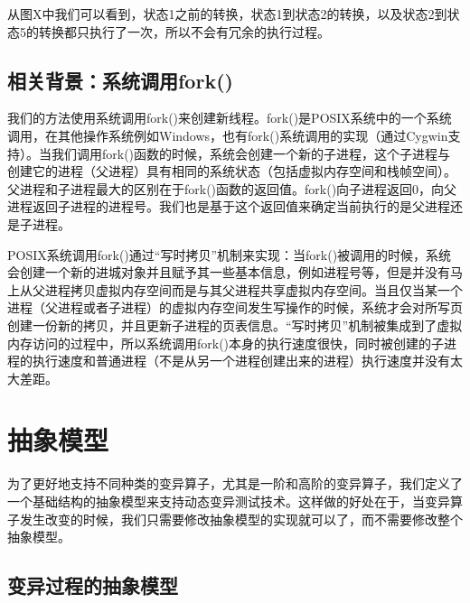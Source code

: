 \documentclass[nofonts]{ctexrep}
\begin{document}
从图X中我们可以看到，状态1之前的转换，状态1到状态2的转换，以及状态2到状态5的转换都只执行了一次，所以不会有冗余的执行过程。


\subsection{相关背景：系统调用fork()}
我们的方法使用系统调用fork()来创建新线程。fork()是POSIX系统中的一个系统调用，在其他操作系统例如Windows，也有fork()系统调用的实现（通过Cygwin支持）。当我们调用fork()函数的时候，系统会创建一个新的子进程，这个子进程与创建它的进程（父进程）具有相同的系统状态（包括虚拟内存空间和栈帧空间）。父进程和子进程最大的区别在于fork()函数的返回值。fork()向子进程返回0，向父进程返回子进程的进程号。我们也是基于这个返回值来确定当前执行的是父进程还是子进程。

POSIX系统调用fork()通过``写时拷贝''机制来实现：当fork()被调用的时候，系统会创建一个新的进城对象并且赋予其一些基本信息，例如进程号等，但是并没有马上从父进程拷贝虚拟内存空间而是与其父进程共享虚拟内存空间。当且仅当某一个进程（父进程或者子进程）的虚拟内存空间发生写操作的时候，系统才会对所写页创建一份新的拷贝，并且更新子进程的页表信息。``写时拷贝''机制被集成到了虚拟内存访问的过程中，所以系统调用fork()本身的执行速度很快，同时被创建的子进程的执行速度和普通进程（不是从另一个进程创建出来的进程）执行速度并没有太大差距。

\section{抽象模型}
\newcommand{\mids}{\ensuremath{I}\xspace}
\newcommand{\execute}{\ensuremath{\mathrm{execute}}\xspace}
\newcommand{\try}{\ensuremath{\mathtt{try}}\xspace}
\newcommand{\apply}{\ensuremath{\mathtt{apply}}\xspace}
\newcommand{\filterv}{\ensuremath{\mathrm{filter\_variants}}\xspace}
\newcommand{\filterm}{\ensuremath{\mathrm{filter\_mutants}}\xspace}
\newcommand{\filterom}{\ensuremath{\mathrm{filter\_out\_mutants}}\xspace}
\newcommand{\VectorSet}{{\tt VectorSet}\xspace}
\newcommand{\ListSet}{{\tt ListSet}\xspace}
\newcommand{\DefaultSet}{{\tt DefaultSet}\xspace}
为了更好地支持不同种类的变异算子，尤其是一阶和高阶的变异算子，我们定义了一个基础结构的抽象模型来支持动态变异测试技术。这样做的好处在于，当变异算子发生改变的时候，我们只需要修改抽象模型的实现就可以了，而不需要修改整个抽象模型。

\subsection{变异过程的抽象模型}
\end{document}
